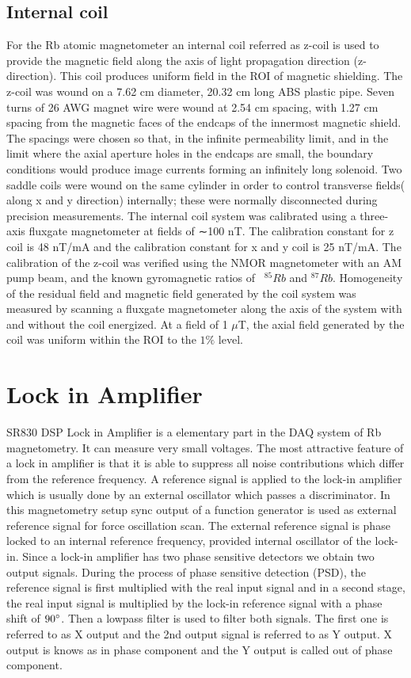 \subsection{Internal coil\label{sec:Internal coil}}
 For the Rb atomic magnetometer an internal coil referred as z-coil is used to provide the magnetic field along the axis of light propagation direction (z-direction). This coil produces uniform field in the ROI  of magnetic shielding. The z-coil was wound on a 7.62 cm diameter, 20.32 cm long ABS plastic pipe. Seven turns of 26 AWG magnet wire were wound at 2.54 cm spacing, with 1.27 cm spacing from the magnetic faces of the endcaps of the innermost magnetic shield. The spacings were chosen so that, in the infinite permeability limit, and in the limit where the axial aperture holes in the endcaps are small, the boundary conditions would produce image currents forming an infinitely long solenoid. Two saddle coils were wound on the same cylinder in order to control transverse fields( along x and y direction) internally; these were normally disconnected during precision measurements. The internal coil system was calibrated using a three-axis fluxgate magnetometer at fields of ∼100 nT.  The calibration constant for z coil is 48 nT/mA and the calibration constant for x and y coil is 25 nT/mA. The calibration of the z-coil was verified using the NMOR magnetometer with an AM pump beam, and the known gyromagnetic ratios of~ $^{85}Rb$ and $^{87}Rb$. Homogeneity of the residual field and magnetic field generated by the coil system was measured by scanning a fluxgate magnetometer along the axis of the system with and without the coil energized. At a field of 1 $\mu$T, the axial field generated by the coil was uniform within the ROI to the $1\%$  level.


\section{Lock in Amplifier}
SR830 DSP Lock in Amplifier is a elementary part in the DAQ system of Rb magnetometry. It can measure very  small voltages. The most attractive feature of a lock in amplifier is that it is able to suppress all noise contributions which differ from the reference frequency. A reference signal is applied to the lock-in amplifier which is usually done by an external oscillator which passes a discriminator. In this magnetometry setup sync output of a function generator is used as external reference signal for force oscillation scan. The external reference signal is phase locked to an internal reference frequency, provided internal oscillator of the lock-in. Since a lock-in amplifier has two phase sensitive detectors we obtain two output signals. During the process of phase sensitive detection (PSD), the reference signal is first multiplied with the real input signal  and in a second stage, the real input signal is multiplied by
the lock-in reference signal with a phase shift of $90\degree$. Then a lowpass filter is used to filter both signals. The first one is referred to as X output and the 2nd output signal is referred to as Y output. X output is knows as in phase component and the Y output is called out of phase component.


